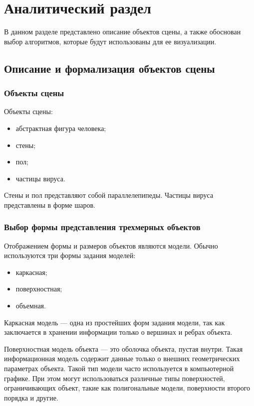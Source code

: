 \chapter{Аналитический раздел}
\label{cha:analysis}


В данном разделе представлено описание объектов сцены, а также обоснован выбор алгоритмов, которые будут использованы для ее визуализации.

\section{Описание и формализация объектов сцены}

\subsection{Объекты сцены}
Объекты сцены:
\begin{itemize}
	\item абстрактная фигура человека;
	\item стены;
	\item пол;
	\item частицы вируса.
\end{itemize}

Стены и пол представляют собой параллелепипеды. Частицы вируса представлены в форме шаров.

\subsection{Выбор формы представления трехмерных объектов}

Отображением формы и размеров объектов являются модели. Обычно используются три формы задания моделей:

\begin{itemize}
	\item каркасная;
	\item поверхностная;
	\item объемная.
\end{itemize}

Каркасная модель --- одна из простейших форм задания модели, так как заключается в хранении информации только о вершинах и ребрах объекта. 

Поверхностная модель объекта --- это оболочка объекта, пустая внутри. Такая информационная модель содержит данные только о внешних геометрических параметрах объекта. Такой тип модели часто используется в компьютерной графике. При этом могут использоваться различные типы поверхностей, ограничивающих объект, такие как полигональные модели, поверхности второго порядка и другие.

